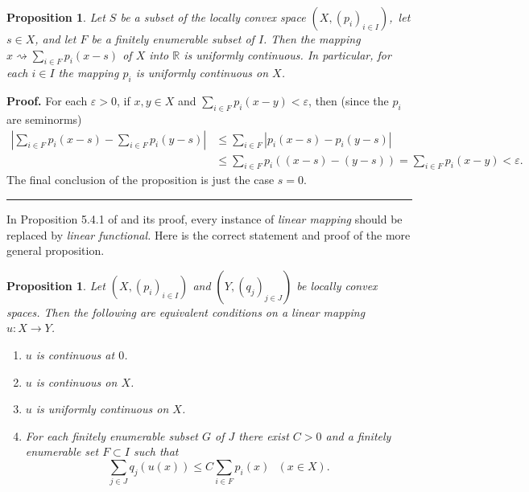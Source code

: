 \documentclass{article}%
\newtheorem{proposition}[theorem]{Proposition}
\newenvironment{proof}[1][Proof]{\noindent\textbf{#1.} }{\ \rule{0.5em}{0.5em}}
\begin{document}
\begin{proposition}
\label{jan22p2}Let $S$ be a subset of the locally convex space $\left(
X,\left(  p_{i}\right)  _{i\in I}\right)  $,\ let $s\in X$, and let $F$ be a
finitely enumerable subset of $I$. Then the mapping $x\rightsquigarrow
\sum_{i\in F}p_{i}(x-s)$ of $X$ into $\mathbb{R}$ is uniformly continuous. In
particular, for each $i\in I$ the mapping $p_{i}$ is uniformly continuous on
$X$.
\end{proposition}

\begin{proof}
For each $\varepsilon>0$, if $x,y\in X$ and $\sum_{i\in F}p_{i}%
(x-y)<\varepsilon$, then (since the $p_{i}$ are seminorms)%
\begin{align*}
\left\vert \sum_{i\in F}p_{i}(x-s)-\sum_{i\in F}p_{i}(y-s)\right\vert  &
\leq\sum_{i\in F}\left\vert p_{i}(x-s)-p_{i}(y-s)\right\vert \\
&  \leq\sum_{i\in F}p_{i}((x-s)-(y-s))=\sum_{i\in F}p_{i}(x-y)<\varepsilon.
\end{align*}
The final conclusion of the proposition is just the case $s=0$.
\end{proof}

%

\medskip


In Proposition 5.4.1 of \cite{BVtech} and its proof, every instance of
\emph{linear mapping }should be replaced by \emph{linear functional. }Here is
the correct statement and proof of the more general proposition.

\begin{proposition}
\label{jan20p1}Let $\left(  X,\left(  p_{i}\right)  _{i\in I}\right)  $ and
$\left(  Y,\left(  q_{j}\right)  _{j\in J}\right)  $ be locally convex spaces.
Then the following are equivalent conditions on a linear mapping
$u:X\rightarrow Y$.

\begin{enumerate}
\item[\emph{(a)}] $u$ is continuous at $0$.

\item[\emph{(b)}] $u$ is continuous on $X$.

\item[\emph{(c)}] $u$ is uniformly continuous on $X$.

\item[\emph{(d)}] For each finitely enumerable subset $G$ of $J$ there exist
$C>0$ and a finitely enumerable set $F\subset I$ such that%
\begin{equation}
\sum_{j\in J}q_{j}(u(x))\leq C\sum_{i\in F}p_{i}(x)\ \ \ (x\in X). \label{30a}%
\end{equation}

\end{enumerate}
\end{proposition}
\end{document}
